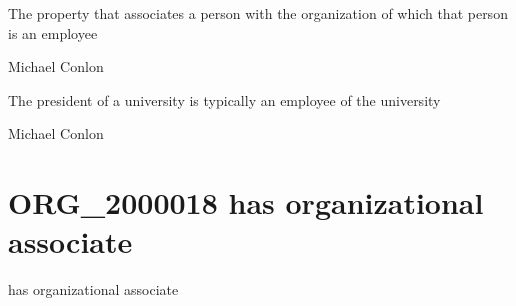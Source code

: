 \documentclass[letterpaper,10pt,english]{sphinxmanual}
\begin{document}
\begin{sphinxShadowBox}

\sphinxAtStartPar
The property that associates a person with the organization of which that person is an employee
\end{sphinxShadowBox}

\begin{sphinxShadowBox}

\sphinxAtStartPar
Michael Conlon 
\end{sphinxShadowBox}

\begin{sphinxShadowBox}

\sphinxAtStartPar
The president of a university is typically an employee of the university
\end{sphinxShadowBox}

\begin{sphinxShadowBox}

\sphinxAtStartPar
{}
\end{sphinxShadowBox}

\begin{sphinxShadowBox}

\sphinxAtStartPar
Michael Conlon 
\end{sphinxShadowBox}
\begin{quote}
\label{\detokenize{doc-ORG_2000018:org-2000018}}\label{\detokenize{doc-ORG_2000018:has-organizational-associate}}\label{\detokenize{doc-ORG_2000018:org-2000018}}
\ignorespaces \end{quote}


\section{ORG\_2000018 \sphinxhyphen{} has organizational associate}
\label{\detokenize{doc-ORG_2000018:org-2000018-has-organizational-associate}}\label{\detokenize{doc-ORG_2000018:index-0}}\label{\detokenize{doc-ORG_2000018::doc}}
\begin{sphinxShadowBox}

\sphinxAtStartPar
has organizational associate
\end{sphinxShadowBox}
\end{document}
